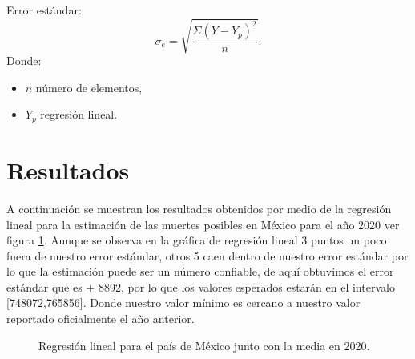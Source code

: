 \documentclass[12pt]{article}
\begin{document}
Error estándar:
\[ \sigma_{e} = \sqrt{\frac{\Sigma (Y - Y_{p})^{2}}{n}} .\]
Donde:
\begin{itemize}
	\item $n$ número de elementos,
	\item $Y_{p}$ regresión lineal.
\end{itemize}

\section{Resultados}
A continuación se muestran los resultados obtenidos por medio de la regresión lineal para la estimación de las muertes posibles en México para el año 2020 ver figura \ref{fig:RegresionMexico}.
Aunque se observa en la gráfica de regresión lineal 3 puntos un poco fuera de nuestro error estándar, otros 5 caen dentro de nuestro error estándar por lo que la estimación puede ser un número confiable, de aquí obtuvimos el error estándar que es $\pm$ 8892, por lo que los valores esperados estarán en el intervalo [748072,765856].
Donde nuestro valor mínimo es cercano a nuestro valor reportado oficialmente el año anterior.

\begin{figure}[H]
\centering
{}%
\hfill
{}%
\hfill
\caption{Regresión lineal para el país de México junto con la media en 2020.}

\label{fig:RegresionMexico}
\end{figure}   
\hfill
\end{document}
